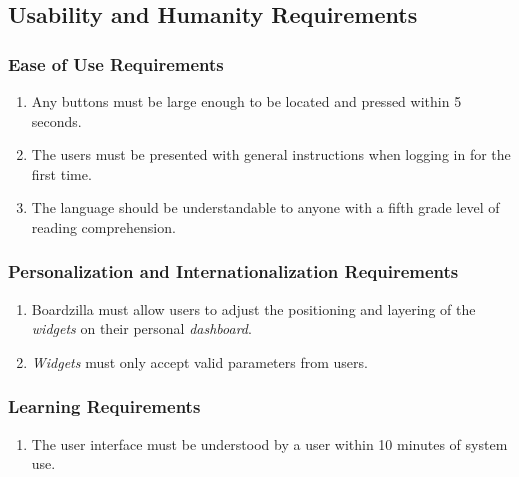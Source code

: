 \documentclass{article}
\begin{document}
	
	\subsection{Usability and Humanity Requirements}
	\label{sub:usability_and_humanity_requirements}
	
	\subsubsection{Ease of Use Requirements}
	\label{ssub:ease_of_use_requirements}
	\begin{enumerate}[{UH}1. ]
		\item Any buttons must be large enough to be located and pressed within 5 seconds.
		\item The users must be presented with general instructions when logging in for the first time.
		\item The language should be understandable to anyone with a fifth grade level of reading comprehension.
	\end{enumerate}
	
	\subsubsection{Personalization and Internationalization Requirements}
	\label{ssub:personalization_and_internationalization_requirements}
	\begin{enumerate}[{UH}1. ]
		\item Boardzilla must allow users to adjust the positioning and layering of the \textit{widgets} on their personal \textit{dashboard}.
		\item \textit{Widgets} must only accept valid parameters from users.
	\end{enumerate}
	
	\subsubsection{Learning Requirements}
	\label{ssub:learning_requirements}
	\begin{enumerate}[{UH}1. ]
		\item The user interface must be understood by a user within 10 minutes of system use.
	\end{enumerate}
	
\end{document}
